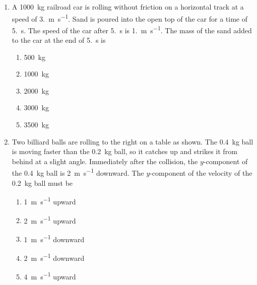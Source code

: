 \documentclass{../../../oss-classkick}
\begin{document}
\begin{multicols}{2}
\begin{enumerate}[leftmargin=18pt]
  \item A \SI{1000}{\kilo\gram} railroad car is rolling without friction on a
    horizontal track at a speed of \SI{3.}{\metre\per\second}. Sand is poured
    into the open top of the car for a time of \SI{5.}{\second}. The speed of
    the car after \SI{5.}{\second} is \SI{1.}{\metre\per\second}. The mass of
    the sand added to the car at the end of \SI{5.}{\second} is
    \begin{center}
    \end{center}
    \begin{enumerate}[nosep,leftmargin=18pt,label=(\Alph*)]
    \item\SI{500 }{\kilo\gram}
    \item\SI{1000}{\kilo\gram}
    \item\SI{2000}{\kilo\gram}
    \item\SI{3000}{\kilo\gram}
    \item\SI{3500}{\kilo\gram}
    \end{enumerate}
    
  \item Two billiard balls are rolling to the right on a table as shown. The
    \SI{.4}{\kilo\gram} ball is moving faster than the \SI{.2}{\kilo\gram}
    ball, so it catches up and strikes it from behind at a slight angle.
    Immediately after the collision, the $y$-component of the
    \SI{.4}{\kilo\gram} ball is \SI{2}{\metre\per\second} downward.
    The $y$-component of the velocity of the \SI{.2}{\kilo\gram} ball must be
    \begin{center}
    \end{center}
    \begin{enumerate}[nosep,leftmargin=18pt,label=(\Alph*)]
    \item \SI{1}{\metre\per\second} upward
    \item \SI{2}{\metre\per\second} upward
    \item \SI{1}{\metre\per\second} downward
    \item \SI{2}{\metre\per\second} downward
    \item \SI{4}{\metre\per\second} upward
    \end{enumerate}
  \end{enumerate}
  

\end{multicols}
\end{document}
